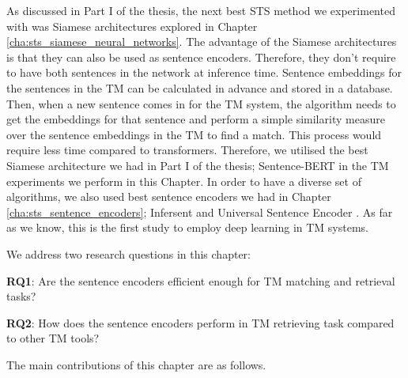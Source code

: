 As discussed in Part I of the thesis, the next best STS method we experimented with was Siamese architectures explored in Chapter \ref{cha:sts_siamese_neural_networks}. The advantage of the Siamese architectures is that they can also be used as sentence encoders. Therefore, they don't require to have both sentences in the network at inference time. Sentence embeddings for the sentences in the TM can be calculated in advance and stored in a database. Then, when a new sentence comes in for the TM system, the algorithm needs to get the embeddings for that sentence and perform a simple similarity measure over the sentence embeddings in the TM to find a match. This process would require less time compared to transformers. Therefore, we utilised the best Siamese architecture we had in Part I of the thesis; Sentence-BERT \autocite{reimers-gurevych-2019-sentence} in the TM experiments we perform in this Chapter. In order to have a diverse set of algorithms, we also used best sentence encoders we had in Chapter \ref{cha:sts_sentence_encoders}; Infersent \autocite{conneau-EtAl:2017:EMNLP2017} and Universal Sentence Encoder \autocite{cer2018universal}. As far as we know, this is the first study to employ deep learning in TM systems. 

We address two research questions in this chapter:

\textbf{RQ1}: Are the sentence encoders efficient enough for TM matching and retrieval tasks?

\textbf{RQ2}: How does the sentence encoders perform in TM retrieving task compared to other TM tools?

The main contributions of this chapter are as follows.

